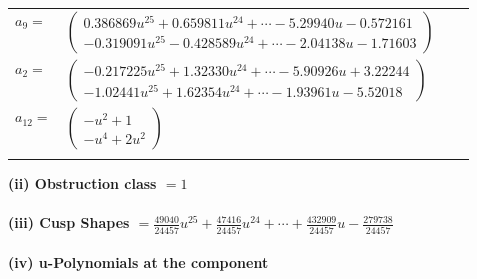 \documentclass[1p]{elsarticle_modified}
\theoremstyle{definition}
\begin{document}
\begin{tabular}{m{7pt} m{180pt} m{7pt} m{180pt} }
\flushright $a_{9}=$&$\begin{pmatrix}0.386869 u^{25}+0.659811 u^{24}+\cdots-5.29940 u-0.572161\\-0.319091 u^{25}-0.428589 u^{24}+\cdots-2.04138 u-1.71603\end{pmatrix}$ \\
\flushright $a_{2}=$&$\begin{pmatrix}-0.217225 u^{25}+1.32330 u^{24}+\cdots-5.90926 u+3.22244\\-1.02441 u^{25}+1.62354 u^{24}+\cdots-1.93961 u-5.52018\end{pmatrix}$ \\
\flushright $a_{12}=$&$\begin{pmatrix}- u^2+1\\- u^4+2 u^2\end{pmatrix}$\\&\end{tabular}
\flushleft \textbf{(ii) Obstruction class $= 1$}\\~\\
\flushleft \textbf{(iii) Cusp Shapes $= \frac{49040}{24457} u^{25}+\frac{47416}{24457} u^{24}+\cdots+\frac{432909}{24457} u-\frac{279738}{24457}$}\\~\\
\newpage\renewcommand{\arraystretch}{1}
\flushleft \textbf{(iv) u-Polynomials at the component}\newline \\
\end{document}
